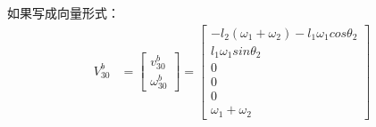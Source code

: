 \documentclass{ctexart}
\begin{document}
如果写成向量形式：
\begin{equation*}
	\begin{aligned}
		V^b_{30} &=\begin{bmatrix}
			v_{30}^b \\
			\omega_{30}^b
		\end{bmatrix} =
		\begin{bmatrix}
			-l_2(\omega_1 + \omega_2)-l_1\omega_1cos\theta_2 \\
			l_1\omega_1sin\theta_2 \\
			0 \\
			0\\
			0 \\
			\omega_1+\omega_2 
		\end{bmatrix}
	\end{aligned}
\end{equation*}
\end{document}
